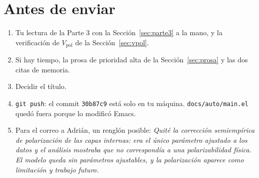 \documentclass[11pt,a4paper]{article}
\newcommand{\arch}[1]{\texttt{\small #1}}
\begin{document}
\section{Antes de enviar}

\begin{enumerate}
\item Tu lectura de la Parte 3 con la Sección~\ref{sec:parte3} a la mano, y la verificación de
$V_{\text{pol}}$ de la Sección~\ref{sec:vpol}.
\item Si hay tiempo, la prosa de prioridad alta de la Sección~\ref{sec:prosa} y las dos citas de
memoria.
\item Decidir el título.
\item \arch{git push}: el commit \texttt{30b87c9} está solo en tu máquina. \arch{docs/auto/main.el}
quedó fuera porque lo modificó Emacs.
\item Para el correo a Adrián, un renglón posible: \emph{Quité la corrección semiempírica de
polarización de las capas internas: era el único parámetro ajustado a los datos y el análisis
mostraba que no correspondía a una polarizabilidad física. El modelo queda sin parámetros
ajustables, y la polarización aparece como limitación y trabajo futuro.}
\end{enumerate}
\end{document}

